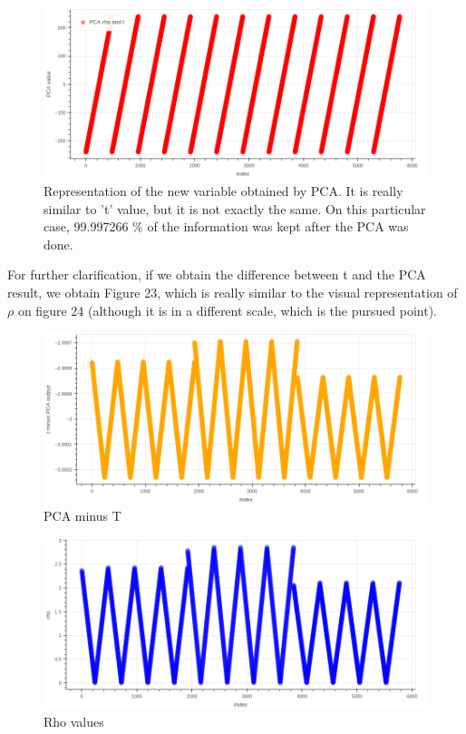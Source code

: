 \documentclass[openany]{article}
\begin{document}
\begin{figure}[!h]
    \centering
    \includegraphics[width=\textwidth]{PCA.png}
    \caption{Representation of the new variable obtained by PCA. It is really similar to 't' value,  but it is not exactly the same. On this particular case, 99.997266 \% of the information was kept after the PCA was done.}
    \label{fig:my_label}
\end{figure}

\newpage 

For further clarification, if we obtain the difference between t and the PCA result, we obtain Figure 23, which is really similar to the visual representation of \(\rho\) on figure 24 (although it is in a different scale, which is the pursued point). 

\begin{figure}[!h]
    \centering
    \includegraphics[width=\textwidth]{PCA-T.png}
    \caption{PCA minus T}
    \label{fig:my_label}
\end{figure}


\begin{figure}[!h]
    \centering
    \includegraphics[width=\textwidth]{Rho.png}
    \caption{Rho values}
    \label{fig:my_label}
\end{figure}
\end{document}
